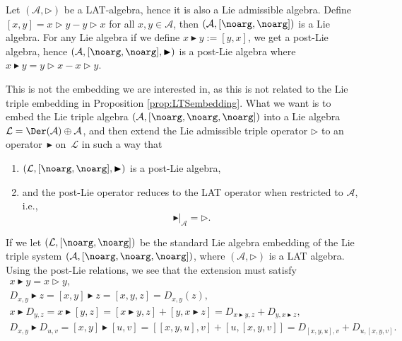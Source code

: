 \documentclass[pdftex]{sigma}
\numberwithin{equation}{section}
\begin{document}
\begin{Example}
Let $(\mathcal{A}, \rhd)$ be a LAT-algebra, hence it is also a Lie admissible algebra. Define $[x,y]=x\rhd y - y \rhd x$ for all $x,y \in \mathcal{A}$, then $(\mathcal{A},[\noarg,\noarg])$ is a Lie algebra. For any Lie algebra if we define $x \blacktriangleright y := [y,x]$, we get a post-Lie algebra, hence $(\mathcal{A},[\noarg,\noarg],\blacktriangleright)$ is a post-Lie algebra where $x\blacktriangleright y = y \rhd x - x \rhd y$.
\end{Example}

This is not the embedding we are interested in, as this is not related to the Lie triple embedding in Proposition \ref{prop:LTSembedding}. What we want is to embed the Lie triple algebra $(\mathcal{A},[\noarg,\noarg,\noarg])$ into a Lie algebra $\mathcal{L}=\Der(\mathcal{A})\oplus \mathcal{A}$, and then extend the Lie admissible triple operator $\rhd$ to an operator~$\blacktriangleright$ on~$\mathcal{L}$ in such a way that
\begin{enumerate}\itemsep=0pt
 \item[(i)] $(\mathcal{L},[\noarg,\noarg],\blacktriangleright)$ is a post-Lie algebra,
 \item[(ii)] and the post-Lie operator reduces to the LAT operator when restricted to $\mathcal{A}$, i.e.,
 \[
 \blacktriangleright \big|_{\mathcal{A}} = \rhd.
 \]
\end{enumerate}
If we let $(\mathcal{L},[\noarg,\noarg])$ be the standard Lie algebra embedding of the Lie triple system $(\mathcal{A},[\noarg,\noarg,\noarg])$, where $(\mathcal{A},\rhd)$ is a LAT algebra. %
Using the post-Lie relations, we see that the extension must satisfy 
\begin{gather*}
 x \blacktriangleright y = x \rhd y, \\
 D_{x,y} \blacktriangleright z = [x,y] \blacktriangleright z = [x,y,z] = D_{x,y} (z), \\
 x \blacktriangleright D_{y,z} = x \blacktriangleright [y,z] = [x\blacktriangleright y,z] + [y,x \blacktriangleright z] = D_{x\blacktriangleright y,z} + D_{y, x \blacktriangleright z} ,\\
 D_{x,y} \blacktriangleright D_{u,v} = [x,y] \blacktriangleright [u,v] = [[x,y,u],v] + [u,[x,y,v]] = D_{[x,y,u],v} + D_{u,[x,y,v]}.
\end{gather*}
\end{document}
